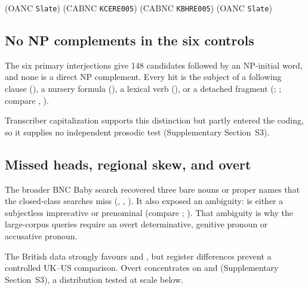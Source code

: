 \documentclass[12pt]{article}
\begin{document}
\ea\label{ex:tier1-gems}
\ea {} \hfill (OANC \texttt{Slate})
\ex {} \hfill (CABNC \texttt{KCERE005})
\ex {} \hfill (CABNC \texttt{KBHRE005})
\ex {} \hfill (OANC \texttt{Slate})
\z
\z

\subsection{No NP complements in the six controls}
\label{sec:cabnc-boundaries}

The six primary interjections give 148 candidates followed by an NP-initial word, and none is a direct NP complement. Every hit is the subject of a following clause (), a nursery formula (), a lexical verb (), or a detached fragment (; ; compare , ).

Transcriber capitalization supports this distinction but partly entered the coding, so it supplies no independent prosodic test (Supplementary Section~S3).

\subsection{Missed heads, regional skew, and overt }
\label{sec:tier1-regional}

The broader BNC Baby search recovered three bare nouns or proper names that the closed-class searches miss (, , ). It also exposed an ambiguity:  is either a subjectless imprecative or prenominal  (compare ; \citealp[35 n.\ 29]{portner2026}). That ambiguity is why the large-corpus queries require an overt determinative, genitive pronoun or accusative pronoun.

The British data strongly favours  and , but register differences prevent a controlled UK--US comparison. Overt  concentrates on  and  (Supplementary Section~S3), a distribution tested at scale below.
\end{document}
